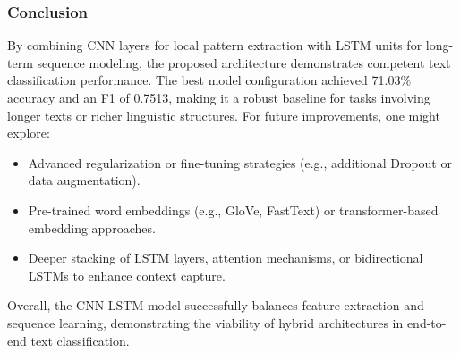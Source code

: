 \subsubsection{Conclusion}

By combining CNN layers for local pattern extraction with LSTM units for long-term sequence modeling, the proposed architecture demonstrates competent text classification performance. The best model configuration achieved 71.03\% accuracy and an F1 of 0.7513, making it a robust baseline for tasks involving longer texts or richer linguistic structures. For future improvements, one might explore:
\begin{itemize}
    \item Advanced regularization or fine-tuning strategies (e.g., additional Dropout or data augmentation).
    \item Pre-trained word embeddings (e.g., GloVe, FastText) or transformer-based embedding approaches.
    \item Deeper stacking of LSTM layers, attention mechanisms, or bidirectional LSTMs to enhance context capture.
\end{itemize}

Overall, the CNN-LSTM model successfully balances feature extraction and sequence learning, demonstrating the viability of hybrid architectures in end-to-end text classification.

